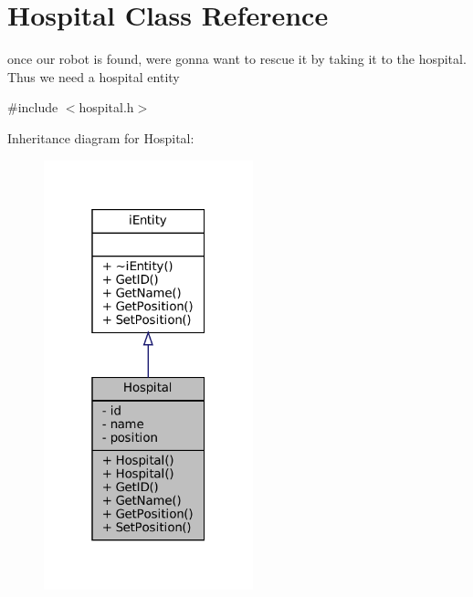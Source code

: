 \hypertarget{classHospital}{}\section{Hospital Class Reference}
\label{classHospital}


once our robot is found, we\textquotesingle{}re gonna want to rescue it by taking it to the hospital. Thus we need a hospital entity  




{\ttfamily \#include $<$hospital.\+h$>$}



Inheritance diagram for Hospital\+:\nopagebreak
\begin{figure}[H]
\begin{center}
\leavevmode
\includegraphics[width=172pt]{classHospital__inherit__graph}
\end{center}
\end{figure}


